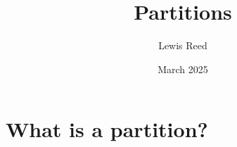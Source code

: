 \documentclass{article}
\begin{document}
\title{Partitions}
\author{Lewis Reed}
\date{March 2025}
\maketitle

\section{What is a partition?}
\end{document}
